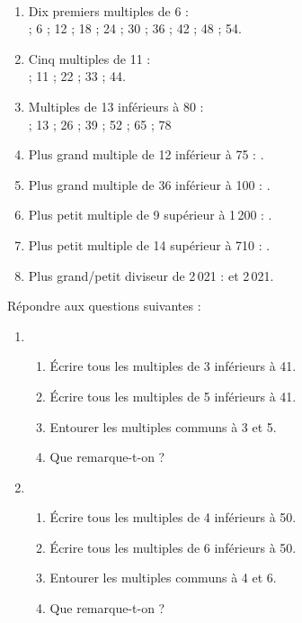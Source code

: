 \begin{colonne*exercice}
\begin{corrige}
   \ \\ [-5mm]\begin{enumerate}
      \item Dix premiers multiples de 6 : \\
         { ; 6 ; 12 ; 18 ; 24 ; 30 ; 36 ; 42 ; 48 ; 54}.
      \item Cinq multiples de 11 : \\
         { ; 11 ; 22 ; 33 ; 44}.
      \item Multiples de 13 inférieurs à 80 : \\
         { ; 13 ; 26 ; 39 ; 52 ; 65 ; 78}
      \item Plus grand multiple de 12 inférieur à 75 : {}.
      \item Plus grand multiple de 36 inférieur à 100 : {}.
      \item Plus petit multiple de 9 supérieur à 1\,200 : {}.
      \item Plus petit multiple de 14 supérieur à 710 : {}.
      \item Plus grand/petit diviseur de 2\,021 : { et 2\,021}.
   \end{enumerate}
\end{corrige}

\bigskip


\begin{exercice} %
   Répondre aux questions suivantes :
   \begin{enumerate}
      \item 
      \begin{enumerate}
         \item Écrire tous les multiples de 3 inférieurs à 41. 
         \item Écrire tous les multiples de 5 inférieurs à 41.
         \item Entourer les multiples communs à 3 et 5.
         \item Que remarque-t-on ?
      \end{enumerate}
      \item
      \begin{enumerate}      
         \item Écrire tous les multiples de 4 inférieurs à 50. 
         \item Écrire tous les multiples de 6 inférieurs à 50.
         \item Entourer les multiples communs à 4 et 6.
         \item Que remarque-t-on ?
      \end{enumerate}
   \end{enumerate}
\end{exercice}


\end{colonne*exercice}
